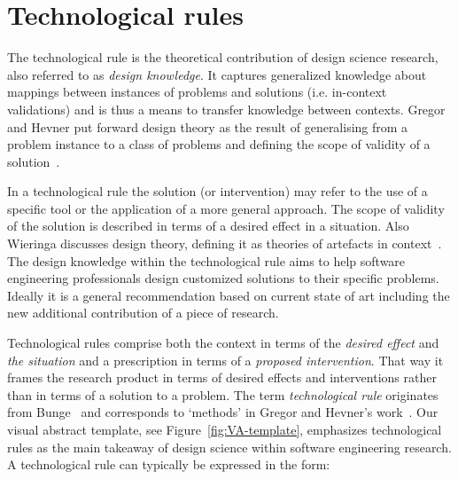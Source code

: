 \documentclass[graybox]{svmult}
\begin{document}
\section{Technological rules}
\label{sec:technologicalrules}

The technological rule is the theoretical contribution of design science research, also referred to as \emph{design knowledge}. It captures generalized knowledge about mappings between instances of problems and solutions (i.e. in-context validations) and is thus a means to transfer knowledge between contexts. Gregor and Hevner put forward design theory as the result of generalising from a problem instance to a class of problems and defining the scope of validity of a solution~\cite{gregor_positioning_2013}. 

In a technological rule the solution (or intervention) may refer to the use of a specific tool or the application of a more general approach. The scope of validity of the solution is described in terms of a desired effect in a situation.  Also Wieringa discusses design theory, defining it as theories of artefacts in context~\cite{wieringa_design_2009}. The design knowledge within the technological rule aims to help software engineering professionals design customized solutions to their specific problems. Ideally it is a general recommendation based on current state of art including the new additional contribution of a piece of research.

Technological rules comprise both the context in terms of the \emph{desired effect} and \emph{the situation} and a prescription in terms of a \emph{proposed intervention}. That way it frames the research product in terms of desired effects and interventions rather than in terms of a solution to a problem. The term \emph{technological rule} originates from Bunge~\cite{bunge_philosophy_1998} and corresponds to `methods' in Gregor and Hevner's work~\cite{gregor_positioning_2013}. Our visual abstract template,  see Figure~\ref{fig:VA-template}, emphasizes technological rules as the main takeaway of design science within software engineering research. A technological rule can typically be expressed in the form: 
\end{document}
